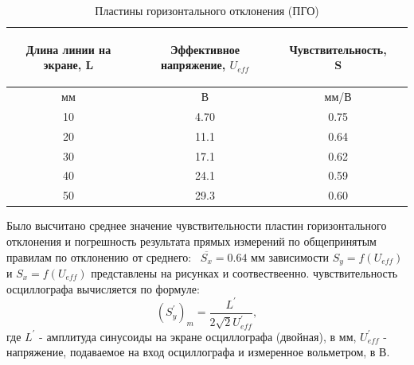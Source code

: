 \begin{center}
\begin{table}[h!]
\centering
\caption{Пластины горизонтального отклонения (ПГО)}
\label{tabl:1}
\begin{tabular}{|c|c|c|c|}
\hline
\begin{minipage}{5cm}
\begin{center}
    Длина линии на экране, L
\end{center}
\end{minipage} &
\begin{minipage}{5cm}
\begin{center}
    Эффективное напряжение, $U_{eff}$
    \end{center}
\end{minipage} &
\begin{minipage}{5cm}
\begin{center}
    Чувствительность, S
    \end{center}
\end{minipage}\\
\hline
мм&В&мм/В\\
\hline
10  &  4.70  &  0.75 \\
20  &  11.1  &  0.64\\
30  &  17.1  &  0.62 \\
40  &  24.1  &  0.59 \\
50  &  29.3  &  0.60 \\

\hline
\end{tabular}
\end{table}
\end{center}
Было высчитано среднее значение чувствительности пластин горизонтального отклонения и погрешность результата прямых измерений по общепринятым правилам по отклонению от среднего:
\ $\overline{S_x}=0.64$ мм
 зависимости $S_y=f(U_{eff})$ и $S_x=f(U_{eff})$ представлены на рисунках и соотвествеенно.
 чувствительность осциллографа вычисляется по формуле:
\begin{equation}
   (S^{'}_y)_m=\frac{L^{'}}{2\sqrt{2}U^{'}_{eff}},
\end{equation}
где $L^{'}$ - амплитуда синусоиды на экране осциллографа (двойная), в мм, $U^{'}_{eff}$ - напряжение, подаваемое на вход осциллографа и измеренное вольметром, в В.
